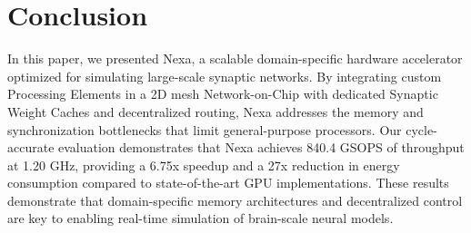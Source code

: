 \section{Conclusion}
In this paper, we presented Nexa, a scalable domain-specific hardware accelerator optimized for simulating large-scale synaptic networks. By integrating custom Processing Elements in a 2D mesh Network-on-Chip with dedicated Synaptic Weight Caches and decentralized routing, Nexa addresses the memory and synchronization bottlenecks that limit general-purpose processors. Our cycle-accurate evaluation demonstrates that Nexa achieves 840.4 GSOPS of throughput at 1.20 GHz, providing a 6.75x speedup and a 27x reduction in energy consumption compared to state-of-the-art GPU implementations. These results demonstrate that domain-specific memory architectures and decentralized control are key to enabling real-time simulation of brain-scale neural models.
